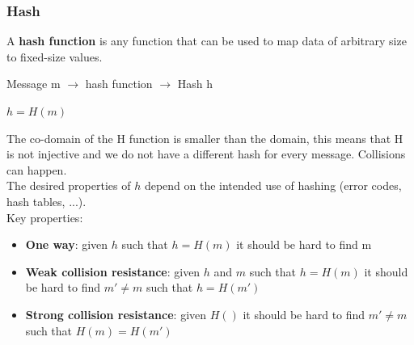 \documentclass[10pt,a4paper]{article}
\begin{document}
\subsubsection{Hash}
A \textbf{hash function} is any function that can be used to map data of arbitrary size to fixed-size values. \begin{description}
	\item Message m $\rightarrow$ hash function $\rightarrow$ Hash h
	\item $h = H(m)$
\end{description}
The co-domain of the H function is smaller than the domain, this means that H is not injective and we do not have a different hash for every message. Collisions can happen. \\
The desired properties of $h$ depend on the intended use of hashing (error codes, hash tables, ...). \\
Key properties:
\begin{itemize}
	\item \textbf{One way}: given $h$ such that $h=H(m)$ it should be hard to find m
	\item \textbf{Weak collision resistance}: given $h$ and $m$ such that $h=H(m)$ it should be hard to find $m' \neq m$ such that $h=H(m')$
	\item \textbf{Strong collision resistance}: given $H()$ it should be hard to find $m' \neq m$ such that $H(m)=H(m')$
\end{itemize}
\end{document}
